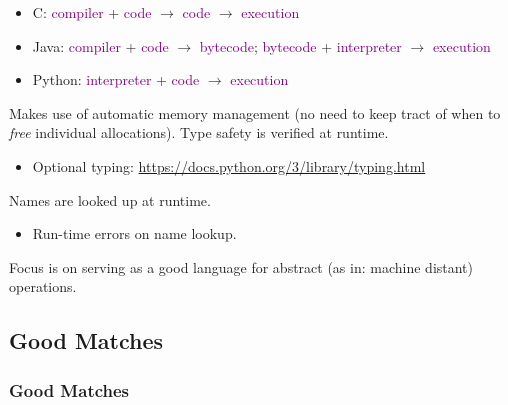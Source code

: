 {\begin{frame}
    \begin{itemize}
      \pause {}
        \begin{itemize}
          \pause \item C: \textcolor{purple}{compiler} + \textcolor{purple}{code} $\rightarrow$ \textcolor{purple}{code} $\rightarrow$ \textcolor{purple}{execution}
          \pause \item Java: \textcolor{purple}{compiler} + \textcolor{purple}{code} $\rightarrow$ \textcolor{purple}{bytecode}; \textcolor{purple}{bytecode} + \textcolor{purple}{interpreter} $\rightarrow$ \textcolor{purple}{execution}
          \pause \item Python: \textcolor{purple}{interpreter} + \textcolor{purple}{code} $\rightarrow$ \textcolor{purple}{execution}
        \end{itemize}
      \pause {} Makes use of automatic memory management (no need to keep tract of when to \textsl{free} individual allocations).
      \pause {} Type safety is verified at runtime.
        \begin{itemize}
          \pause \item Optional typing: \url{https://docs.python.org/3/library/typing.html}
        \end{itemize}
      \pause {} Names are looked up at runtime.
        \begin{itemize}
          \pause \item Run-time errors on name lookup.
        \end{itemize}
      \pause {} Focus is on serving as a good language for abstract (as in: machine distant) operations.
    \end{itemize}
\end{frame}

%    

\subsection{Good Matches}
\begin{frame}
    \frametitle{Good Matches}
    \vspace{5mm}
    

\end{frame}}
